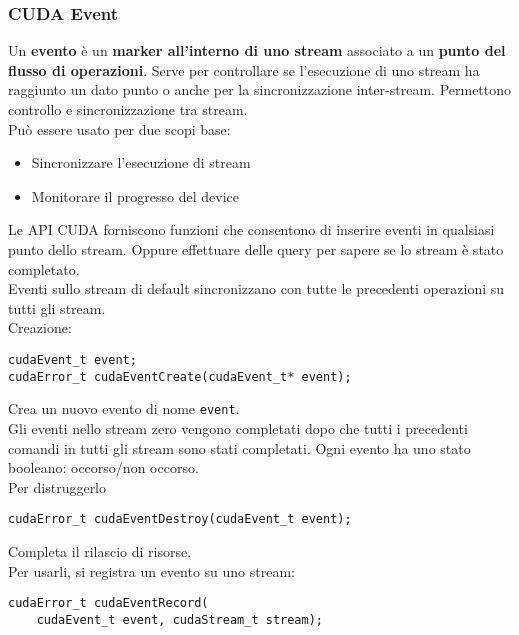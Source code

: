 \subsubsection{CUDA Event}

Un \textbf{evento} è un \textbf{marker all'interno di uno stream} associato a un \textbf{punto del flusso di operazioni}. Serve per controllare se l'esecuzione di uno stream ha raggiunto un dato punto o anche per la sincronizzazione inter-stream. Permettono controllo e sincronizzazione tra stream.\\

Può essere usato per due scopi base:
\begin{itemize}
	\item Sincronizzare l'esecuzione di stream
	\item Monitorare il progresso del device
\end{itemize}

Le API CUDA forniscono funzioni che consentono di inserire eventi in qualsiasi punto dello stream. Oppure effettuare delle query per sapere se lo stream è stato completato. \\

Eventi sullo stream di default sincronizzano con tutte le precedenti operazioni su tutti gli stream.\\

Creazione:
\begin{verbatim}
cudaEvent_t event;
cudaError_t cudaEventCreate(cudaEvent_t* event);
\end{verbatim}
Crea un nuovo evento di nome \texttt{event}.\\

Gli eventi nello stream zero vengono completati dopo che tutti i precedenti comandi in tutti gli stream sono stati completati. Ogni evento ha uno stato booleano: occorso/non occorso.\\

Per distruggerlo
\begin{verbatim}
cudaError_t cudaEventDestroy(cudaEvent_t event);
\end{verbatim}
Completa il rilascio di risorse.\\

Per usarli, si registra un evento su uno stream:
\begin{verbatim}
cudaError_t cudaEventRecord(
	cudaEvent_t event, cudaStream_t stream);
\end{verbatim}

